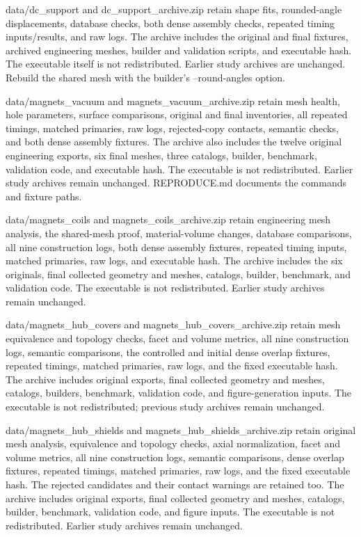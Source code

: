 data/dc\_support and dc\_support\_archive.zip retain shape fits, rounded-angle displacements, database checks,
both dense assembly checks, repeated timing inputs/results, and raw logs. The archive includes the original
and final fixtures, archived engineering meshes, builder and validation scripts, and executable hash. The
executable itself is not redistributed. Earlier study archives are unchanged. Rebuild the shared mesh with the
builder's --round-angles option.


data/magnets\_vacuum and magnets\_vacuum\_archive.zip retain mesh health, hole parameters, surface
comparisons, original and final inventories, all repeated timings, matched primaries, raw logs, rejected-copy
contacts, semantic checks, and both dense assembly fixtures. The archive also includes the twelve original
engineering exports, six final meshes, three catalogs, builder, benchmark, validation code, and executable
hash. The executable is not redistributed. Earlier study archives remain unchanged. REPRODUCE.md documents the
commands and fixture paths.


data/magnets\_coils and magnets\_coils\_archive.zip retain engineering mesh analysis, the shared-mesh proof,
material-volume changes, database comparisons, all nine construction logs, both dense assembly fixtures,
repeated timing inputs, matched primaries, raw logs, and executable hash. The archive includes the six
originals, final collected geometry and meshes, catalogs, builder, benchmark, and validation code. The
executable is not redistributed. Earlier study archives remain unchanged.


data/magnets\_hub\_covers and magnets\_hub\_covers\_archive.zip retain mesh equivalence and topology checks,
facet and volume metrics, all nine construction logs, semantic comparisons, the controlled and initial dense
overlap fixtures, repeated timings, matched primaries, raw logs, and the fixed executable hash. The archive
includes original exports, final collected geometry and meshes, catalogs, builders, benchmark, validation
code, and figure-generation inputs. The executable is not redistributed; previous study archives remain
unchanged.


data/magnets\_hub\_shields and magnets\_hub\_shields\_archive.zip retain original mesh analysis, equivalence
and topology checks, axial normalization, facet and volume metrics, all nine construction logs, semantic
comparisons, dense overlap fixtures, repeated timings, matched primaries, raw logs, and the fixed executable
hash. The rejected candidates and their contact warnings are retained too. The archive includes original
exports, final collected geometry and meshes, catalogs, builder, benchmark, validation code, and figure
inputs. The executable is not redistributed. Earlier study archives remain unchanged.


